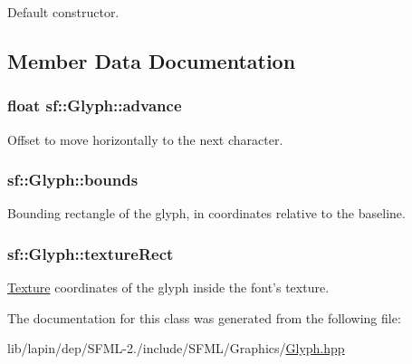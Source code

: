 Default constructor. 



\subsection{Member Data Documentation}
\hypertarget{classsf_1_1_glyph_aeac19b97ec11409147191606b784deda}{
\subsubsection[{advance}]{\setlength{\rightskip}{0pt plus 5cm}float sf\-::\-Glyph\-::advance}}\label{classsf_1_1_glyph_aeac19b97ec11409147191606b784deda}


Offset to move horizontally to the next character. 

\hypertarget{classsf_1_1_glyph_a6f3c892093167914adc31e52e5923f4b}{
\subsubsection[{bounds}]{ sf\-::\-Glyph\-::bounds}}\label{classsf_1_1_glyph_a6f3c892093167914adc31e52e5923f4b}


Bounding rectangle of the glyph, in coordinates relative to the baseline. 

\hypertarget{classsf_1_1_glyph_a0d502d326449f8c49011ed91d2805f5b}{
\subsubsection[{texture\-Rect}]{ sf\-::\-Glyph\-::texture\-Rect}}\label{classsf_1_1_glyph_a0d502d326449f8c49011ed91d2805f5b}


\hyperlink{classsf_1_1_texture}{Texture} coordinates of the glyph inside the font's texture. 



The documentation for this class was generated from the following file\-:\begin{DoxyCompactItemize}
\item 
lib/lapin/dep/\-S\-F\-M\-L-\/2./include/\-S\-F\-M\-L/\-Graphics/\hyperlink{lapin_2dep_2_s_f_m_l-2_83_2include_2_s_f_m_l_2_graphics_2_glyph_8hpp}{Glyph.\-hpp}\end{DoxyCompactItemize}
